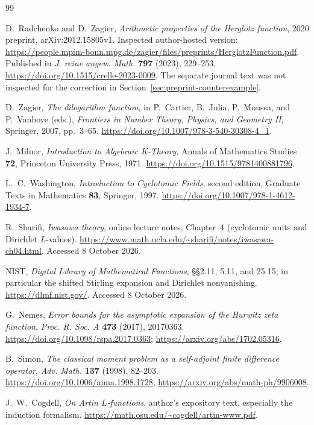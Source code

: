 \documentclass[11pt]{article}
\numberwithin{equation}{section}
\theoremstyle{definition}
\theoremstyle{remark}
\begin{document}
\clearpage
{}
{}
\begin{thebibliography}{99}

D.~Radchenko and D.~Zagier,
\emph{Arithmetic properties of the Herglotz function},
2020 preprint, arXiv:2012.15805v1.
Inspected author-hosted version:
\url{https://people.mpim-bonn.mpg.de/zagier/files/preprints/HerglotzFunction.pdf}.
Published in \emph{J. reine angew. Math.} \textbf{797} (2023), 229--253,
\url{https://doi.org/10.1515/crelle-2023-0009}.
The separate journal text was not inspected for the correction in
Section~\ref{sec:preprint-counterexample}.

D.~Zagier,
\emph{The dilogarithm function},
in P.~Cartier, B.~Julia, P.~Moussa, and P.~Vanhove (eds.),
\emph{Frontiers in Number Theory, Physics, and Geometry II},
Springer, 2007, pp.~3--65.
\url{https://doi.org/10.1007/978-3-540-30308-4_1}.

J.~Milnor,
\emph{Introduction to Algebraic K-Theory},
Annals of Mathematics Studies \textbf{72},
Princeton University Press, 1971.
\url{https://doi.org/10.1515/9781400881796}.

L.~C.~Washington,
\emph{Introduction to Cyclotomic Fields}, second edition,
Graduate Texts in Mathematics \textbf{83}, Springer, 1997.
\url{https://doi.org/10.1007/978-1-4612-1934-7}.

R.~Sharifi,
\emph{Iwasawa theory}, online lecture notes, Chapter~4
(cyclotomic units and Dirichlet $L$-values).
\url{https://www.math.ucla.edu/~sharifi/notes/iwasawa-ch04.html}.
Accessed 8 October 2026.

NIST,
\emph{Digital Library of Mathematical Functions},
\S\S2.11, 5.11, and 25.15; in particular the shifted Stirling
expansion and Dirichlet nonvanishing.
\url{https://dlmf.nist.gov/}.
Accessed 8 October 2026.

G.~Nemes,
\emph{Error bounds for the asymptotic expansion of the Hurwitz
zeta function},
\emph{Proc. R. Soc. A} \textbf{473} (2017), 20170363.
\url{https://doi.org/10.1098/rspa.2017.0363};
\url{https://arxiv.org/abs/1702.05316}.

B.~Simon,
\emph{The classical moment problem as a self-adjoint finite
difference operator},
\emph{Adv. Math.} \textbf{137} (1998), 82--203.
\url{https://doi.org/10.1006/aima.1998.1728};
\url{https://arxiv.org/abs/math-ph/9906008}.

J.~W.~Cogdell,
\emph{On Artin $L$-functions}, author's expository text,
especially the induction formalism.
\url{https://math.osu.edu/~cogdell/artin-www.pdf}.


\end{thebibliography}
\end{document}
